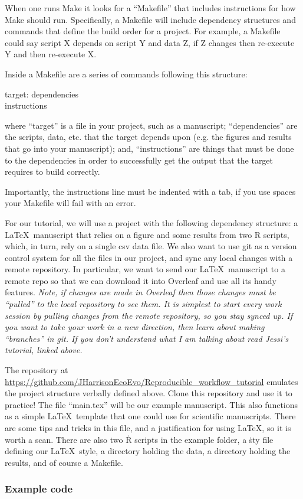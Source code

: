 \documentclass{article}
\begin{document}
When one runs {\sf Make} it looks for a ``Makefile'' that includes instructions for how {\sf Make} should run. Specifically, a Makefile will include dependency structures and commands that define the build order for a project. For example, a Makefile could say script X depends on script Y and data Z, if Z changes then re-execute Y and then re-execute X. 

Inside a Makefile are a series of commands following this structure: 

\begin{center}
target: dependencies\\
\indent instructions
\end{center}

\noindent where ``target'' is a file in your project, such as a manuscript; ``dependencies'' are the scripts, data, etc. that the target depends upon (e.g. the figures and results that go into your manuscript); and, ``instructions'' are things that must be done to the dependencies in order to successfully get the output that the target requires to build correctly. 

Importantly, the instructions line must be indented with a tab, if you use spaces your Makefile will fail with an error.

For our tutorial, we will use a project with the following dependency structure: a \LaTeX\ manuscript that relies on a figure and some results from two {\sf R} scripts, which, in turn, rely on a single csv data file. We also want to use {\sf git} as a version control system for all the files in our project, and sync any local changes with a remote repository. In particular, we want to send our \LaTeX\ manuscript to a remote repo so that we can download it into {\sf Overleaf} and use all its handy features. \emph{Note, if changes are made in Overleaf then those changes must be ``pulled'' to the local repository to see them. It is simplest to start every work session by pulling changes from the remote repository, so you stay synced up. If you want to take your work in a new direction, then learn about making ``branches'' in {\sf git}. If you don't understand what I am talking about read Jessi's tutorial, linked above.}   

The repository at \url{https://github.com/JHarrisonEcoEvo/Reproducible_workflow_tutorial} emulates the project structure verbally defined above. Clone this repository and use it to practice! The file ``main.tex'' will be our example manuscript. This also functions as a simple \LaTeX\ template that one could use for scientific manuscripts. There are some tips and tricks in this file, and a justification for using \LaTeX, so it is worth a scan. There are also two \.R scripts in the example folder, a \.sty file defining our \LaTeX\ style, a directory holding the data, a directory holding the results, and of course a Makefile. 

\subsubsection{Example code}


\end{document}
